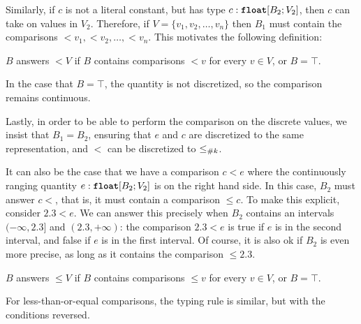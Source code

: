 Similarly, if $c$ is not a literal constant, but has type $c : \text{\ttfamily\bfseries float}[B_2; V_2]$, then $c$ can take on values in $V_2$. Therefore, if $V = \{v_1, v_2, \dots, v_n\}$ then $B_1$ must contain the comparisons $<\!\!v_1, <\!\!v_2, \dots, <\!\!v_n$. This motivates the following definition:

\begin{definition}
    \label{def:answers-less}
    $B$ answers $<\!\!V$ if $B$ contains comparisons $<\!\!v$ for every $v \in V$, or $B = \top$.
\end{definition}

In the case that $B = \top$, the quantity is not discretized, so the comparison remains continuous.

Lastly, in order to be able to perform the comparison on the discrete values, we insist that $B_1 = B_2$, ensuring that $e$ and $c$ are discretized to the same representation, and $<$ can be discretized to $\leq_{\#{k}}$.

It can also be the case that we have a comparison $c < e$ where the continuously ranging quantity $e : \text{\ttfamily\bfseries float}[B_2; V_2]$ is on the right hand side. In this case, $B_2$ must answer $c\!\!<$, that is, it must contain a comparison $\leq\!\!c$. To make this explicit, consider $2.3 < e$. We can answer this precisely when $B_2$ contains an intervals $(-\infty, 2.3]$ and $(2.3, +\infty)$: the comparison $2.3 < e$ is true if $e$ is in the second interval, and false if $e$ is in the first interval. Of course, it is also ok if $B_2$ is even more precise, as long as it contains the comparison $\leq\!\!2.3$.

\begin{definition}
    \label{def:answers-less-equal}
    $B$ answers $\leq\!\!V$ if $B$ contains comparisons $\leq\!\!v$ for every $v \in V$, or $B = \top$.
\end{definition}

For less-than-or-equal comparisons, the typing rule is similar, but with the conditions reversed.










